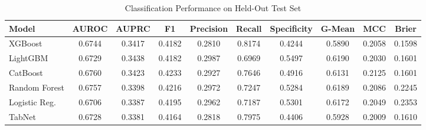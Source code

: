 \begin{table}
\centering
\caption{Classification Performance on Held-Out Test Set}
\label{tab:results}
\begin{tabular}{lccccccccc}
\toprule
Model & AUROC & AUPRC & F1 & Precision & Recall & Specificity & G-Mean & MCC & Brier \\
\midrule
XGBoost & 0.6744 & 0.3417 & 0.4182 & 0.2810 & 0.8174 & 0.4244 & 0.5890 & 0.2058 & 0.1598 \\
LightGBM & 0.6729 & 0.3438 & 0.4182 & 0.2987 & 0.6969 & 0.5497 & 0.6190 & 0.2030 & 0.1601 \\
CatBoost & 0.6760 & 0.3423 & 0.4233 & 0.2927 & 0.7646 & 0.4916 & 0.6131 & 0.2125 & 0.1601 \\
Random Forest & 0.6757 & 0.3398 & 0.4216 & 0.2972 & 0.7247 & 0.5284 & 0.6189 & 0.2086 & 0.2245 \\
Logistic Reg. & 0.6706 & 0.3387 & 0.4195 & 0.2962 & 0.7187 & 0.5301 & 0.6172 & 0.2049 & 0.2353 \\
TabNet & 0.6728 & 0.3381 & 0.4164 & 0.2818 & 0.7975 & 0.4406 & 0.5928 & 0.2009 & 0.1610 \\
\bottomrule
\end{tabular}
\end{table}
